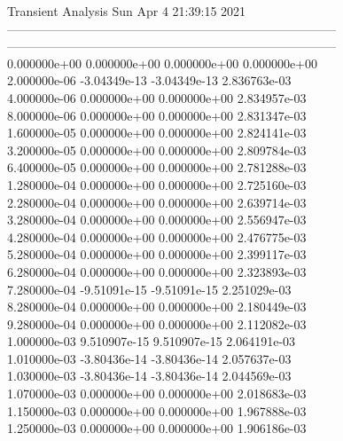                                    Transient Analysis  Sun Apr  4 21:39:15  2021\\ \hline
--------------------------------------------------------------------------------\\ \hline
--------------------------------------------------------------------------------\\ 	0.000000e+00	0.000000e+00	0.000000e+00	0.000000e+00	\\ 	2.000000e-06	-3.04349e-13	-3.04349e-13	2.836763e-03	\\ 	4.000000e-06	0.000000e+00	0.000000e+00	2.834957e-03	\\ 	8.000000e-06	0.000000e+00	0.000000e+00	2.831347e-03	\\ 	1.600000e-05	0.000000e+00	0.000000e+00	2.824141e-03	\\ 	3.200000e-05	0.000000e+00	0.000000e+00	2.809784e-03	\\ 	6.400000e-05	0.000000e+00	0.000000e+00	2.781288e-03	\\ 	1.280000e-04	0.000000e+00	0.000000e+00	2.725160e-03	\\ 	2.280000e-04	0.000000e+00	0.000000e+00	2.639714e-03	\\ 	3.280000e-04	0.000000e+00	0.000000e+00	2.556947e-03	\\ 	4.280000e-04	0.000000e+00	0.000000e+00	2.476775e-03	\\ 	5.280000e-04	0.000000e+00	0.000000e+00	2.399117e-03	\\ 	6.280000e-04	0.000000e+00	0.000000e+00	2.323893e-03	\\ 	7.280000e-04	-9.51091e-15	-9.51091e-15	2.251029e-03	\\ 	8.280000e-04	0.000000e+00	0.000000e+00	2.180449e-03	\\ 	9.280000e-04	0.000000e+00	0.000000e+00	2.112082e-03	\\ 	1.000000e-03	9.510907e-15	9.510907e-15	2.064191e-03	\\ 	1.010000e-03	-3.80436e-14	-3.80436e-14	2.057637e-03	\\ 	1.030000e-03	-3.80436e-14	-3.80436e-14	2.044569e-03	\\ 	1.070000e-03	0.000000e+00	0.000000e+00	2.018683e-03	\\ 	1.150000e-03	0.000000e+00	0.000000e+00	1.967888e-03	\\ 	1.250000e-03	0.000000e+00	0.000000e+00	1.906186e-03	\\ \hline
